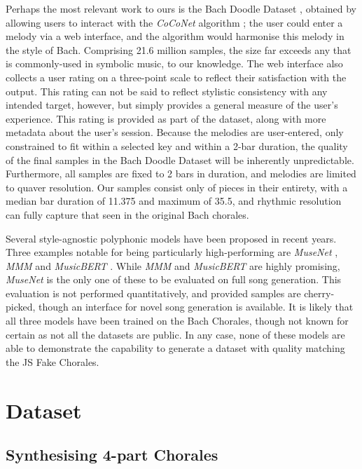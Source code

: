 \documentclass{article}
\begin{document}
Perhaps the most relevant work to ours is the Bach Doodle Dataset \cite{bachdoodle}, obtained by allowing users to interact with the \textit{CoCoNet} algorithm \cite{coconet}; the user could enter a melody via a web interface, and the algorithm would harmonise this melody in the style of Bach. Comprising 21.6 million samples, the size far exceeds any that is commonly-used in symbolic music, to our knowledge. The web interface also collects a user rating on a three-point scale to reflect their satisfaction with the output. This rating can not be said to reflect stylistic consistency with any intended target, however, but simply provides a general measure of the user's experience. This rating is provided as part of the dataset, along with more metadata about the user's session. Because the melodies are user-entered, only constrained to fit within a selected key and within a 2-bar duration, the quality of the final samples in the Bach Doodle Dataset will be inherently unpredictable. Furthermore, all samples are fixed to 2 bars in duration, and melodies are limited to quaver resolution. Our samples consist only of pieces in their entirety, with a median bar duration of 11.375 and maximum of 35.5, and rhythmic resolution can fully capture that seen in the original Bach chorales. 

Several style-agnostic polyphonic models have been proposed in recent years. Three examples notable for being particularly high-performing are \textit{MuseNet} \cite{musenet}, \textit{MMM} \cite{mmm} and \textit{MusicBERT} \cite{musicbert}. While \textit{MMM} and \textit{MusicBERT} are highly promising, \textit{MuseNet} is the only one of these to be evaluated on full song generation. This evaluation is not performed quantitatively, and provided samples are cherry-picked, though an interface for novel song generation is available. It is likely that all three models have been trained on the Bach Chorales, though not known for certain as not all the datasets are public. In any case, none of these models are able to demonstrate the capability to generate a dataset with quality matching the JS Fake Chorales. 
\section{Dataset}\label{sec:dataset}

\subsection{Synthesising 4-part Chorales}\label{subsec:synthesising}
\end{document}
